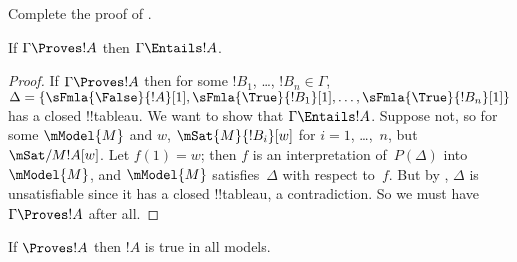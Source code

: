 \documentclass[../../../include/open-logic-section]{subfiles}
\begin{document}
\begin{prob}
Complete the proof of .
\end{prob}

\begin{cor}
If $\Gamma \Proves !A$ then $\Gamma \Entails !A$.
\end{cor}

\begin{proof}
  If $\Gamma \Proves !A$ then for some $!B_1$, \dots, $!B_n \in
  \Gamma$, $\Delta = \{\sFmla{\False}{!A}[1], \sFmla{\True}{!B_1}[1],
  \dots, \sFmla{\True}{!B_n}[1]\}$ has a closed !!{tableau}. We want
  to show that $\Gamma \Entails !A$. Suppose not, so for some
  $\mModel{M}$ and $w$, $\mSat{M}{!B_i}[w]$ for $i=1$, \dots,~$n$, but
  $\mSat/{M}{!A}[w]$. Let $f(1) = w$; then $f$ is an interpretation
  of~$P(\Delta)$ into~$\mModel{M}$, and $\mModel{M}$ satisfies~$\Delta$ with
  respect to~$f$. But by , $\Delta$ is
  unsatisfiable since it has a closed !!{tableau}, a
  contradiction. So we must have $\Gamma \Proves !A$ after all.
\end{proof}

\begin{cor}
If $\Proves !A$ then $!A$ is true in all models.
\end{cor}
\end{document}
